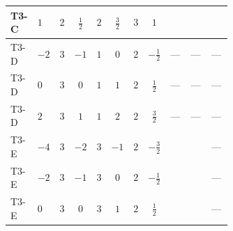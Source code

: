 \documentclass[8pt]{article}
\begin{document}
\begin{landscape}
\begin{longtable}{@{}llcccccc >{\raggedright\arraybackslash}p{0.21\linewidth} >{\raggedright\arraybackslash}p{0.21\linewidth} >{\raggedright\arraybackslash}p{0.21\linewidth}@{}}
\midrule
T3-C & $1$ & $2$ & $\frac{1}{2}$ & $2$ & $\frac{3}{2}$ & $3$ & $1$ & \scriptsize\adjustbox{max width=\linewidth}{$\begin{gathered} +2 {\lambda_{12}^{(A)}} {\lambda_{S_1}^{(1)}}\end{gathered}$} & \scriptsize\adjustbox{max width=\linewidth}{$\begin{gathered} +2 {\lambda_{12}^{(A)}} {\lambda_{S_2}^{(1)}}\end{gathered}$} & \scriptsize\adjustbox{max width=\linewidth}{$\begin{gathered} +{\lambda_{HS_1}^{(A)}} {\lambda_{HS_2}^{(A)}}\end{gathered}$} \\
\midrule
T3-D & $-2$ & $3$ & $-1$ & $1$ & $0$ & $2$ & $-\frac{1}{2}$ & --- & --- & --- \\
\midrule
T3-D & $0$ & $3$ & $0$ & $1$ & $1$ & $2$ & $\frac{1}{2}$ & --- & --- & --- \\
\midrule
T3-D & $2$ & $3$ & $1$ & $1$ & $2$ & $2$ & $\frac{3}{2}$ & --- & --- & --- \\
\midrule
T3-E & $-4$ & $3$ & $-2$ & $3$ & $-1$ & $2$ & $-\frac{3}{2}$ & \scriptsize\adjustbox{max width=\linewidth}{$\begin{gathered} +2 {\lambda_{12}^{(A)}} {\lambda_{S_1}^{(1)}}\end{gathered}$} & \scriptsize\adjustbox{max width=\linewidth}{$\begin{gathered} +2 {\lambda_{12}^{(A)}} {\lambda_{S_2}^{(1)}}\end{gathered}$} & --- \\
\midrule
T3-E & $-2$ & $3$ & $-1$ & $3$ & $0$ & $2$ & $-\frac{1}{2}$ & \scriptsize\adjustbox{max width=\linewidth}{$\begin{gathered} +2 {\lambda_{12}^{(A)}} {\lambda_{S_1}^{(1)}}\end{gathered}$} & \scriptsize\adjustbox{max width=\linewidth}{$\begin{gathered} +2 {\lambda_{12}^{(A)}} {\lambda_{S_2}^{(1)}}\end{gathered}$} & --- \\
\midrule
T3-E & $0$ & $3$ & $0$ & $3$ & $1$ & $2$ & $\frac{1}{2}$ & \scriptsize\adjustbox{max width=\linewidth}{$\begin{gathered} +2 {\lambda_{12}^{(A)}} {\lambda_{S_1}^{(1)}}\end{gathered}$} & \scriptsize\adjustbox{max width=\linewidth}{$\begin{gathered} +2 {\lambda_{12}^{(A)}} {\lambda_{S_2}^{(1)}}\end{gathered}$} & --- \\

\end{longtable}
\end{landscape}
\end{document}
